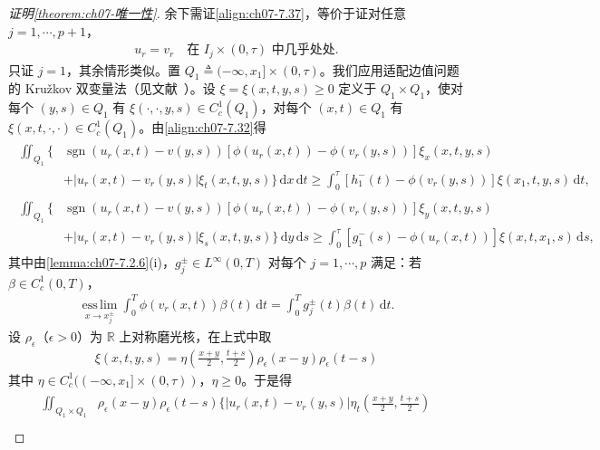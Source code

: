 \documentclass[../../main.tex]{subfiles}%
\begin{document}
\begin{proof}[证明\cref{theorem:ch07-唯一性}]
余下需证\eqref{align:ch07-7.37}，等价于证对任意 $j=1,\cdots ,p+1$，
\begin{align}
u_r=v_r\quad\text{在 }I_j\times(0,\tau)\text{ 中几乎处处}. \label{align:ch07-7.38}
\end{align}
只证 $j=1$，其余情形类似。置 $Q_1\triangleq (-\infty,x_1]\times(0,\tau)$。我们应用适配边值问题的 Kružkov 双变量法（见文献~\cite{ref68,ref75,ref91}）。设 $\xi=\xi(x,t,y,s)\geqslant0$ 定义于 $Q_1\times Q_1$，使对每个 $(y,s)\in Q_1$ 有 $\xi(\cdot,\cdot,y,s)\in C^1_c(Q_1)$，对每个 $(x,t)\in Q_1$ 有 $\xi(x,t,\cdot,\cdot)\in C^1_c(Q_1)$。由\eqref{align:ch07-7.32}得
\begin{align*}
\begin{aligned}
\iint_{Q_1}\{&\operatorname{sgn}(u_r(x,t)-v(y,s))[\phi(u_r(x,t))-\phi(v_r(y,s))]\xi_x(x,t,y,s)\\
&+|u_r(x,t)-v_r(y,s)|\xi_t(x,t,y,s)\}\,\mathrm{d}x\,\mathrm{d}t
\geqslant\int_0^\tau[h_1^-(t)-\phi(v_r(y,s))]\xi(x_1,t,y,s)\,\mathrm{d}t,
\end{aligned}
\end{align*}
\begin{align*}
\begin{aligned}
\iint_{Q_1}\{&\operatorname{sgn}(u_r(x,t)-v(y,s))[\phi(u_r(x,t))-\phi(v_r(y,s))]\xi_y(x,t,y,s)\\
&+|u_r(x,t)-v_r(y,s)|\xi_s(x,t,y,s)\}\,\mathrm{d}y\,\mathrm{d}s
\geqslant\int_0^\tau[g_1^-(s)-\phi(u_r(x,t))]\xi(x,t,x_1,s)\,\mathrm{d}s,
\end{aligned}
\end{align*}
其中由\cref{lemma:ch07-7.2.6}(i)，$g_j^\pm\in L^\infty(0,T)$ 对每个 $j=1,\cdots ,p$ 满足：若 $\beta\in C^1_c(0,T)$，
\begin{align}
\operatorname*{ess\,lim}_{x\to x_j^\pm}\int_0^T\phi(v_r(x,t))\beta(t)\,\mathrm{d}t
=\int_0^T g_j^\pm(t)\beta(t)\,\mathrm{d}t. \label{align:ch07-7.39}
\end{align}
设 $\rho_\epsilon$（$\epsilon>0$）为 $\mathbb{R}$ 上对称磨光核，在上式中取
\begin{align}
\xi(x,t,y,s)=\eta\left(\frac{x+y}{2},\frac{t+s}{2}\right)\rho_\epsilon(x-y)\rho_\epsilon(t-s) \label{align:ch07-7.40}
\end{align}
其中 $\eta\in C^1_c((-\infty,x_1]\times(0,\tau))$，$\eta\geqslant0$。于是得
\begin{align}
\begin{aligned}
\iint_{Q_1\times Q_1}&\rho_\epsilon(x-y)\rho_\epsilon(t-s)\Big\{|u_r(x,t)-v_r(y,s)|\eta_t\left(\frac{x+y}{2},\frac{t+s}{2}\right)\\

\end{aligned}
\end{align}
\end{proof}
\end{document}
